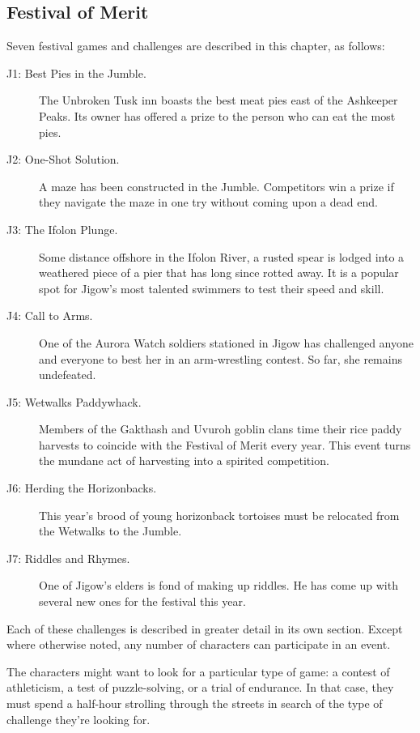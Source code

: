 \documentclass[a4paper, 11pt, bg=full, twocolumn, nooutline]{dndbook}
\begin{document}
\subsection{Festival of Merit}

Seven festival games and challenges are described in this chapter, as follows:

\begin{description}
\item[J1: Best Pies in the Jumble.] The Unbroken Tusk inn boasts the best meat pies east of the Ashkeeper Peaks. Its owner has offered a prize to the person who can eat the most pies.
\item[J2: One-Shot Solution.] A maze has been constructed in the Jumble. Competitors win a prize if they navigate the maze in one try without coming upon a dead end.
\item[J3: The Ifolon Plunge.] Some distance offshore in the Ifolon River, a rusted spear is lodged into a weathered piece of a pier that has long since rotted away. It is a popular spot for Jigow's most talented swimmers to test their speed and skill.
\item[J4: Call to Arms.] One of the Aurora Watch soldiers stationed in Jigow has challenged anyone and everyone to best her in an arm-wrestling contest. So far, she remains undefeated.
\item[J5: Wetwalks Paddywhack.] Members of the Gakthash and Uvuroh goblin clans time their rice paddy harvests to coincide with the Festival of Merit every year. This event turns the mundane act of harvesting into a spirited competition.
\item[J6: Herding the Horizonbacks.] This year's brood of young horizonback tortoises must be relocated from the Wetwalks to the Jumble.
\item[J7: Riddles and Rhymes.] One of Jigow's elders is fond of making up riddles. He has come up with several new ones for the festival this year.
\end{description}

Each of these challenges is described in greater detail in its own section. Except where otherwise noted, any number of characters can participate in an event.

The characters might want to look for a particular type of game: a contest of athleticism, a test of puzzle-solving, or a trial of endurance. In that case, they must spend a half-hour strolling through the streets in search of the type of challenge they're looking for.
\end{document}
